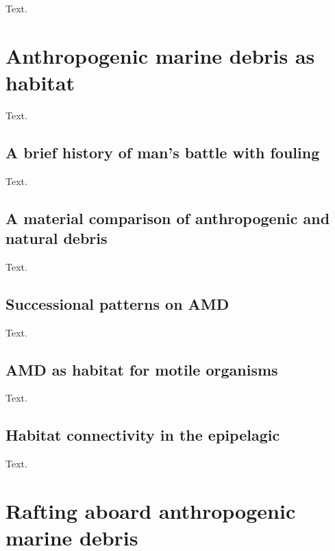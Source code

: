 \documentclass[a4paper, nobind]{templates/ociamthesis}
\begin{document}
Text.

\hypertarget{anthropogenic-marine-debris-as-habitat}{%
\section{Anthropogenic marine debris as habitat}\label{anthropogenic-marine-debris-as-habitat}}

Text.

\hypertarget{a-brief-history-of-mans-battle-with-fouling}{%
\subsection{A brief history of man's battle with fouling}\label{a-brief-history-of-mans-battle-with-fouling}}

Text.

\hypertarget{a-material-comparison-of-anthropogenic-and-natural-debris}{%
\subsection{A material comparison of anthropogenic and natural debris}\label{a-material-comparison-of-anthropogenic-and-natural-debris}}

Text.

\hypertarget{successional-patterns-on-amd}{%
\subsection{Successional patterns on AMD}\label{successional-patterns-on-amd}}

Text.

\hypertarget{amd-as-habitat-for-motile-organisms}{%
\subsection{AMD as habitat for motile organisms}\label{amd-as-habitat-for-motile-organisms}}

Text.

\hypertarget{habitat-connectivity-in-the-epipelagic}{%
\subsection{Habitat connectivity in the epipelagic}\label{habitat-connectivity-in-the-epipelagic}}

Text.

\hypertarget{rafting-aboard-anthropogenic-marine-debris}{%
\section{Rafting aboard anthropogenic marine debris}\label{rafting-aboard-anthropogenic-marine-debris}}
\end{document}
